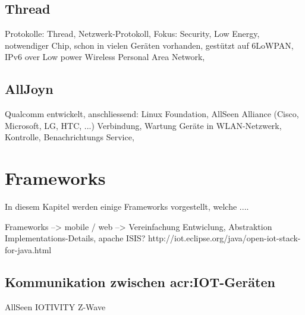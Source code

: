 \subsection{Thread}
Protokolle: Thread, Netzwerk-Protokoll, Fokus: Security, Low Energy, notwendiger Chip, schon in vielen Geräten vorhanden, gestützt auf 6LoWPAN, IPv6 over Low power Wireless Personal Area Network, 


\subsection{AllJoyn}
Qualcomm entwickelt, anschliessend: Linux Foundation, AllSeen Alliance (Cisco, Microsoft, LG, HTC, ...)
Verbindung, Wartung Geräte in WLAN-Netzwerk, Kontrolle, Benachrichtungs Service, 

\section{Frameworks}
In diesem Kapitel werden einige Frameworks vorgestellt, welche ....

Frameworks --> mobile / web --> Vereinfachung Entwiclung, Abstraktion Implementations-Details, 
apache ISIS?
http://iot.eclipse.org/java/open-iot-stack-for-java.html

\subsection{Kommunikation zwischen \gls{acr:IOT}-Geräten}
AllSeen
IOTIVITY
Z-Wave